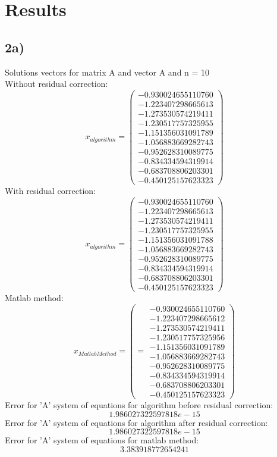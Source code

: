 \section{Results}
\subsection{2a)}
Solutions vectors for matrix A and vector A and n = 10 \\
Without residual correction:
\[ x_{algorithm} = \left(\begin{array}{cc}
-0.930024655110760 \\
-1.223407298665613 \\
-1.273530574219411 \\
-1.230517757325955 \\
-1.151356031091789 \\
-1.056883669282743 \\
-0.952628310089775 \\
-0.834334594319914 \\
-0.683708806203301 \\
-0.450125157623323
\end{array} \right)
\]
With residual correction:
\[ x_{algorithm} = \left(\begin{array}{cc}
-0.930024655110760 \\
-1.223407298665613 \\
-1.273530574219411 \\
-1.230517757325955 \\
-1.151356031091788 \\
-1.056883669282743 \\
-0.952628310089775 \\
-0.834334594319914 \\
-0.683708806203301 \\
-0.450125157623323
\end{array} \right)
\]
Matlab method:
\[
x_{Matlab Method} = \left(  = \begin{array}{cc}
-0.930024655110760 \\
-1.223407298665612 \\
-1.273530574219411 \\
-1.230517757325956 \\
-1.151356031091789 \\
-1.056883669282743 \\
-0.952628310089775 \\
-0.834334594319914 \\
-0.683708806203301 \\
-0.450125157623323
\end{array} \right)
\]
Error for 'A' system of equations for algorithm before residual correction: \[ 1.986027322597818e-15 \]
Error for 'A' system of equations for algorithm after residual correction: \[ 1.986027322597818e-15 \]
Error for 'A' system of equations for matlab method: \[ 3.383918772654241 \]
\newpage
